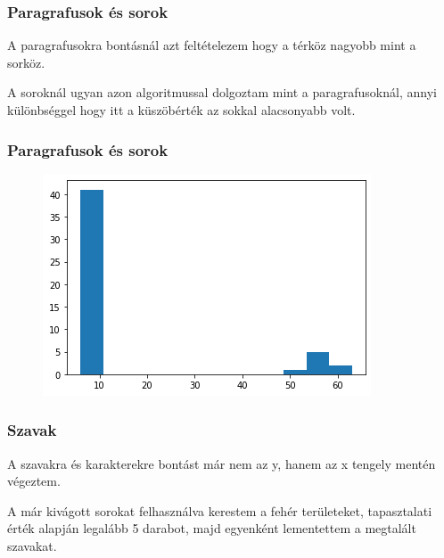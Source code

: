 \documentclass{beamer}
\begin{document}
\begin{frame}[fragile]
\frametitle{Paragrafusok és sorok}

A paragrafusokra bontásnál azt feltételezem hogy a térköz nagyobb mint a sorköz.

\bigskip

A soroknál ugyan azon algoritmussal dolgoztam mint a paragrafusoknál, annyi különbséggel hogy itt a küszöbérték az sokkal alacsonyabb volt.

\end{frame}

\begin{frame}[fragile]
\frametitle{Paragrafusok és sorok}

\begin{figure}[!tbp]
  \centering
  \begin{minipage}[b]{1\textwidth}
    \includegraphics[width=\textwidth]{images/segment_hist.png}
  \end{minipage}
\end{figure}

\end{frame}

\begin{frame}[fragile]
\frametitle{Szavak}

A szavakra és karakterekre bontást már nem az y, hanem az x tengely mentén végeztem.

\bigskip

A már kivágott sorokat felhasználva kerestem a fehér területeket, tapasztalati érték alapján legalább 5 darabot, majd egyenként lementettem a megtalált szavakat.

\end{frame}
\end{document}
